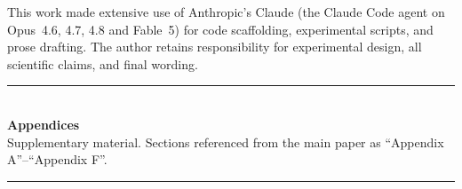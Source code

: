 \documentclass{article}
\begin{document}











\begin{ack}
This work made extensive use of Anthropic's Claude (the Claude Code agent on
Opus~4.6, 4.7, 4.8 and Fable~5) for code scaffolding, experimental scripts, and
prose drafting. The author retains responsibility for experimental design, all
scientific claims, and final wording.
\end{ack}



\appendix
\newpage
\begin{center}
  \rule{0.5\linewidth}{0.4pt}\\[0.6em]
  {\Large\bfseries Appendices}\\[0.25em]
  {\small Supplementary material. Sections referenced from the main
   paper as ``Appendix A''--``Appendix F''.}\\[0.4em]
  \rule{0.5\linewidth}{0.4pt}
\end{center}
\vspace{0.5em}







\end{document}
